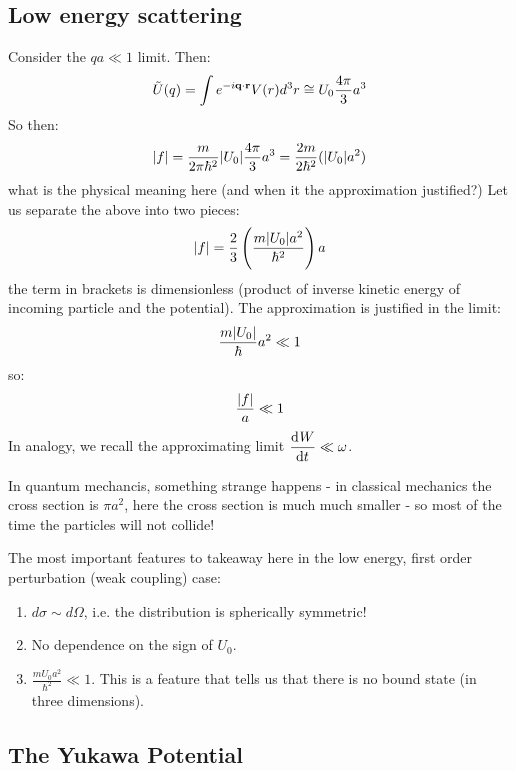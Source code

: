 \subsection{Low energy scattering}
Consider the $qa \ll 1$ limit. Then:
\begin{equation}
    \tilde{U}(q) = \int e^{-i\mathbf{q} \cdot \mathbf{r}}V(r)d^3r \cong U_0 \frac{4\pi}{3}a^3
\end{equation}
So then:
\begin{equation}
    \lvert f \rvert = \frac{m}{2\pi\hbar^2}\lvert U_0 \rvert\frac{4\pi}{3}a^3 = \frac{2m}{2\hbar^2}(\lvert U_0 \rvert a^2)
\end{equation}
what is the physical meaning here (and when it the approximation justified?) Let us separate the above into two pieces:
\begin{equation}
    \lvert f \rvert = \frac{2}{3}\left(\frac{m\lvert U_0 \rvert a^2}{\hbar^2}\right)a
\end{equation}
the term in brackets is dimensionless (product of inverse kinetic energy of incoming particle and the potential). The approximation is justified in the limit:
\begin{equation}
    \frac{m\lvert U_0 \rvert}{\hbar}a^2 \ll 1
\end{equation}
so:
\begin{equation}
    \frac{\lvert f \rvert}{a} \ll 1
\end{equation}
In analogy, we recall the approximating limit $\dod{W}{t} \ll \omega$.

In quantum mechancis, something strange happens - in classical mechanics the cross section is $\pi a^2$, here the cross section is much much smaller - so most of the time the particles will not collide! 

The most important features to takeaway here in the low energy, first order perturbation (weak coupling) case:
\begin{enumerate}
    \item $d\sigma \sim d\Omega$, i.e. the distribution is spherically symmetric!
    \item No dependence on the sign of $U_0$. 
    \item $\frac{mU_0 a^2}{\hbar^2} \ll 1$. This is a feature that tells us that there is no bound state (in three dimensions).
\end{enumerate}

\subsection{The Yukawa Potential}

